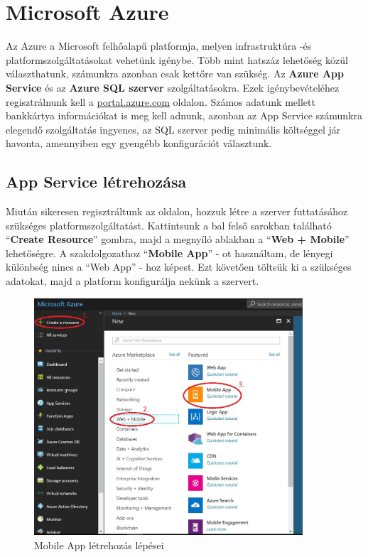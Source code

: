 \documentclass[a4paper,12pt]{report}
\begin{document}
\section{Microsoft Azure}
    Az Azure a Microsoft felhőalapű platformja, melyen infrastruktúra -és platformszolgáltatásokat vehetünk igénybe. Több mint
    hatszáz lehetőség közül választhatunk, számunkra azonban csak kettőre van szükség. Az \textbf{Azure App Service} és az
    \textbf{Azure SQL szerver} szolgáltatásokra. Ezek igénybevételéhez regisztrálnunk kell a \url{portal.azure.com} oldalon.
    Számos adatunk mellett bankkártya információkat is meg kell adnunk, azonban az App Service számunkra elegendő szolgáltatás
    ingyenes, az SQL szerver pedig minimális költséggel jár havonta, amennyiben egy gyengébb konfigurációt választunk.

\subsection{App Service létrehozása}
    Miután sikeresen regisztráltunk az oldalon, hozzuk létre a szerver futtatásához szükséges platformszolgáltatást. Kattintsunk
    a bal felső sarokban található ``\textbf{Create Resource}'' gombra, majd a megnyíló ablakban a ``\textbf{Web + Mobile}'' lehetőségre.
    A szakdolgozathoz ``\textbf{Mobile App}'' - ot használtam, de lényegi különbség nincs a ``Web App'' - hoz képest.
    Ezt követően töltsük ki a szükséges adatokat, majd a platform konfigurálja nekünk a szervert.

\begin{figure}[H]
    \centering
    \includegraphics[width=10cm,keepaspectratio]{images/azurecreatemobilapp.jpg}
    \caption{Mobile App létrehozás lépései}
    \label{fig: MobileApp}
\end{figure}
\end{document}
